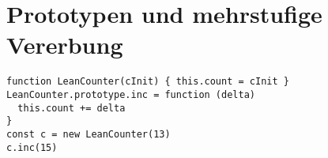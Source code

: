 \section{Prototypen und mehrstufige Vererbung}
\begin{verbatim}
function LeanCounter(cInit) { this.count = cInit }
LeanCounter.prototype.inc = function (delta)
  this.count += delta
}
const c = new LeanCounter(13)
c.inc(15)
\end{verbatim}

